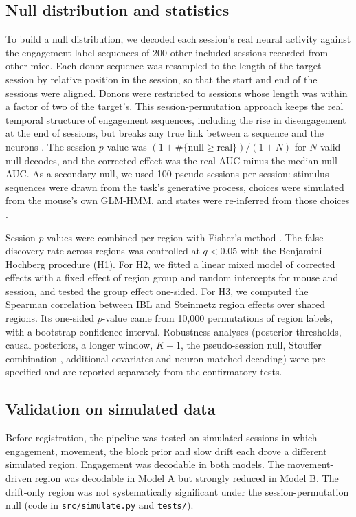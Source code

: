 \documentclass[11pt]{article}
\begin{document}
\subsection{Null distribution and statistics}
To build a null distribution, we decoded each session's real neural activity against the engagement label sequences of 200 other included sessions recorded from other mice. Each donor sequence was resampled to the length of the target session by relative position in the session, so that the start and end of the sessions were aligned. Donors were restricted to sessions whose length was within a factor of two of the target's. This session-permutation approach keeps the real temporal structure of engagement sequences, including the rise in disengagement at the end of sessions, but breaks any true link between a sequence and the neurons \citep{harris2020}. The session $p$-value was $(1 + \#\{\text{null} \geq \text{real}\})/(1+N)$ for $N$ valid null decodes, and the corrected effect was the real AUC minus the median null AUC. As a secondary null, we used 100 pseudo-sessions per session: stimulus sequences were drawn from the task's generative process, choices were simulated from the mouse's own GLM-HMM, and states were re-inferred from those choices \citep[in the spirit of][]{findling2025}.

Session $p$-values were combined per region with Fisher's method \citep{fisher1932}. The false discovery rate across regions was controlled at $q<0.05$ with the Benjamini--Hochberg procedure \citep{bh1995} (H1). For H2, we fitted a linear mixed model of corrected effects with a fixed effect of region group and random intercepts for mouse and session, and tested the group effect one-sided. For H3, we computed the Spearman correlation between IBL and Steinmetz region effects over shared regions. Its one-sided $p$-value came from 10,000 permutations of region labels, with a bootstrap confidence interval. Robustness analyses (posterior thresholds, causal posteriors, a longer window, $K\pm1$, the pseudo-session null, Stouffer combination \citep{stouffer1949}, additional covariates and neuron-matched decoding) were pre-specified and are reported separately from the confirmatory tests.

\subsection{Validation on simulated data}
Before registration, the pipeline was tested on simulated sessions in which engagement, movement, the block prior and slow drift each drove a different simulated region. Engagement was decodable in both models. The movement-driven region was decodable in Model A but strongly reduced in Model B. The drift-only region was not systematically significant under the session-permutation null (code in \texttt{src/simulate.py} and \texttt{tests/}).
\end{document}
